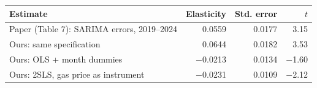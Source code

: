 \begin{tabular}{lrrr}
\toprule
Estimate & Elasticity & Std. error & $t$ \\
\midrule
Paper (Table 7): SARIMA errors, 2019--2024 & 0.0559 & 0.0177 & 3.15 \\
Ours: same specification & 0.0644 & 0.0182 & 3.53 \\
Ours: OLS + month dummies & $-$0.0213 & 0.0134 & $-$1.60 \\
Ours: 2SLS, gas price as instrument & $-$0.0231 & 0.0109 & $-$2.12 \\
\bottomrule
\end{tabular}
